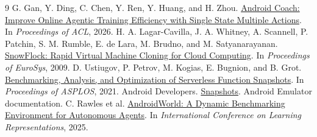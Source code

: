 \documentclass[11pt,letterpaper]{article}
\begin{document}
\begin{thebibliography}{9}
 G. Gan, Y. Ding, C. Chen, Y. Ren, Y. Huang, and H. Zhou.
\href{https://aclanthology.org/2026.acl-long.613/}{Android Coach: Improve Online Agentic Training Efficiency with Single State Multiple Actions}. In \emph{Proceedings of ACL}, 2026.
 H. A. Lagar-Cavilla, J. A. Whitney, A. Scannell, P. Patchin, S. M. Rumble, E. de Lara, M. Brudno, and M. Satyanarayanan.
\href{https://www.scs.stanford.edu/~rumble/papers/LagarCavillaEurosys09.pdf}{SnowFlock: Rapid Virtual Machine Cloning for Cloud Computing}. In \emph{Proceedings of EuroSys}, 2009.
 D. Ustiugov, P. Petrov, M. Kogias, E. Bugnion, and B. Grot.
\href{https://arxiv.org/abs/2101.09355}{Benchmarking, Analysis, and Optimization of Serverless Function Snapshots}. In \emph{Proceedings of ASPLOS}, 2021.
 Android Developers. \href{https://developer.android.com/studio/run/emulator-snapshots}{Snapshots}. Android Emulator documentation.
 C. Rawles et al.
\href{https://proceedings.iclr.cc/paper_files/paper/2025/hash/01a83bc2f2732a58e6aa731e659e7101-Abstract-Conference.html}{AndroidWorld: A Dynamic Benchmarking Environment for Autonomous Agents}. In \emph{International Conference on Learning Representations}, 2025.
\end{thebibliography}
\end{document}
